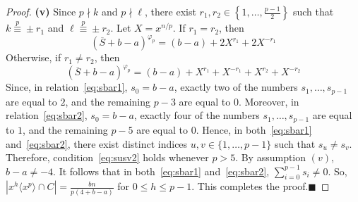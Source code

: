 \documentclass[12pt]{article}
\begin{document}
\begin{proof}
\indent\textbf{(v)} Since $p\nmid k$ and $p\nmid \ell$, there exist $r_1,r_2\in\left\{1,\ldots,\frac{p-1}{2}\right\}$ such that $k\stackrel{p}{\equiv}\pm r_1$ and $\ell\stackrel{p}{\equiv}\pm r_2$. Let $X=x^{n/p}$. If $r_1=r_2$, then
\begin{equation}\label{eq:sbar1}
(\overline{S}+b-a)^{\varphi_p}=(b-a)+2X^{r_1}+2X^{-r_1}	
\end{equation}
Otherwise, if $r_1\neq r_2$, then
\begin{equation}\label{eq:sbar2}
(\overline{S}+b-a)^{\varphi_p}=(b-a)+X^{r_1}+X^{-r_1}+X^{r_2}+X^{-r_2}	
\end{equation}	
Since, in relation~\eqref{eq:sbar1}, \(s_0=b-a\), exactly two of the numbers
\(s_1,\ldots,s_{p-1}\) are equal to \(2\), and the remaining
\(p-3\) are equal to \(0\). Moreover, in relation~\eqref{eq:sbar2},
\(s_0=b-a\), exactly four of the numbers
\(s_1,\ldots,s_{p-1}\) are equal to \(1\), and the remaining
\(p-5\) are equal to \(0\). Hence, in both~\eqref{eq:sbar1} and~\eqref{eq:sbar2},
there exist distinct indices \(u,v\in\{1,\ldots,p-1\}\) such that
\(s_u\neq s_v\). Therefore, condition~\eqref{eq:susv2} holds whenever \(p>5\). By assumption \((v)\), \(b-a\neq -4\). It follows that in both~\eqref{eq:sbar1} and~\eqref{eq:sbar2}, \(\sum_{i=0}^{p-1}s_i\neq 0\). So, $
\left|x^h\langle x^p\rangle\cap C\right|
=
\frac{bn}{p(4+b-a)}$ for $0\le h\le p-1$. This completes the proof.\hfill$\blacksquare$



	\end{proof}	
\end{document}
